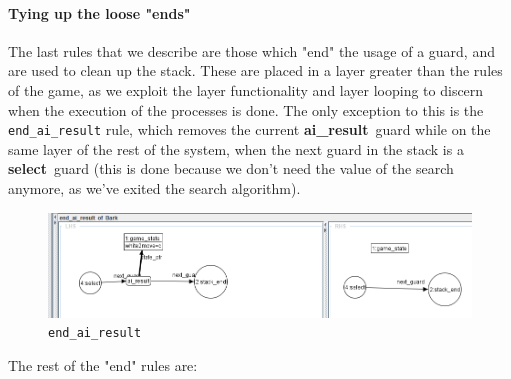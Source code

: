 \documentclass[a4paper, 10pt]{scrartcl}
\newcommand{\noderepr}[1]{\textsf{\textbf{#1}}}
\newcommand{\airesult}{\noderepr{ai\_result}}
\newcommand{\select}{\noderepr{select}}
\begin{document}
    \paragraph*{Tying up the loose "ends"} The last rules that we describe are those which "end" the usage of a guard, and are used to clean up the stack.
    These are placed in a layer greater than the rules of the game, as we exploit the layer functionality and layer looping to discern when the execution of the processes is done.
    The only exception to this is the \texttt{end\_ai\_result} rule, which removes the current \airesult\ guard while on the same layer of the rest of the system, when the next guard in the stack is a \select\ guard (this is done because we don't need the value of the search anymore, as we've exited the search algorithm).
    \begin{figure}[H]
        \centering
        \includegraphics[width=.8\linewidth]{images/end_ai_result.png}
        \caption{\texttt{end\_ai\_result}}
    \end{figure} 
    The rest of the "end" rules are:
\end{document}

